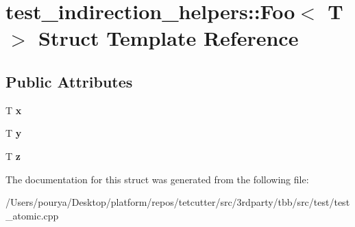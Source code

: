\hypertarget{structtest__indirection__helpers_1_1Foo}{}\section{test\+\_\+indirection\+\_\+helpers\+:\+:Foo$<$ T $>$ Struct Template Reference}
\label{structtest__indirection__helpers_1_1Foo}
\subsection*{Public Attributes}
\begin{DoxyCompactItemize}
\item 
\hypertarget{structtest__indirection__helpers_1_1Foo_a528cd493cfe3d217e559c2453255aa97}{}T {\bfseries x}\label{structtest__indirection__helpers_1_1Foo_a528cd493cfe3d217e559c2453255aa97}

\item 
\hypertarget{structtest__indirection__helpers_1_1Foo_add37483a46348f153683014599199b1a}{}T {\bfseries y}\label{structtest__indirection__helpers_1_1Foo_add37483a46348f153683014599199b1a}

\item 
\hypertarget{structtest__indirection__helpers_1_1Foo_a84d1fa493943aff7658025a08b6e5475}{}T {\bfseries z}\label{structtest__indirection__helpers_1_1Foo_a84d1fa493943aff7658025a08b6e5475}

\end{DoxyCompactItemize}


The documentation for this struct was generated from the following file\+:\begin{DoxyCompactItemize}
\item 
/\+Users/pourya/\+Desktop/platform/repos/tetcutter/src/3rdparty/tbb/src/test/test\+\_\+atomic.\+cpp\end{DoxyCompactItemize}
